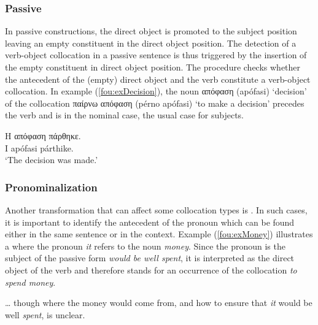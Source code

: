 \documentclass[output=paper]{langsci/langscibook}
\begin{document}
\subsubsection{Passive}
In passive constructions, the direct object is promoted to the subject position leaving an empty constituent in the direct object position. The detection of a verb-object collocation in a passive sentence is thus triggered by the insertion of the empty constituent in direct object position. The  procedure checks whether the antecedent of the (empty) direct object and the verb constitute a verb-object collocation.
In example (\ref{fou:exDecision}), %
the noun  {απόφαση} (apófasi) `decision' of the collocation {παίρνω απόφαση} (pérno apófasi) `to make a decision'  precedes the verb and is in the nominal case, the usual case for subjects.

\ea\label{fou:exDecision}
\gll Η απόφαση πάρθηκε. \\
I apófasi párthike. \\
\glt `The decision was made.'
\z

\subsubsection{Pronominalization}
Another transformation that can affect some collocation types is .  In such cases, it is important to identify the antecedent of the pronoun which can be found either in the same sentence or in the context. Example (\ref{fou:exMoney}) %
illustrates a  where the pronoun \textit{it} refers to the noun \textit{money}. Since the pronoun is the subject of the passive form \textit{would be well spent}, it is interpreted as the direct object of the verb and therefore stands for an occurrence of the collocation \textit{to spend money}.

\ea\label{fou:exMoney}
  \ldots{} though where the money would come from, and how to ensure that\textit{ it}
would be well \textit{spent}, is unclear.
\z
\end{document}
